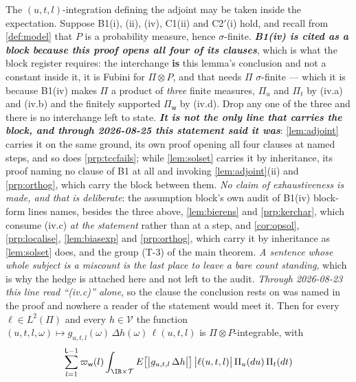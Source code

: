 \begin{lemma}\label{lem:adjfubini}
The $(u,t,l)$-integration defining the adjoint may be taken inside the expectation.
Suppose B1(i), (ii), (iv), C1(ii) and C2$'$(i) hold, and recall from \cref{def:model} that $P$ is a
probability measure, hence $\sigma$-finite. \emph{\textbf{B1(iv) is cited as a block because this proof
opens all four of its clauses}}, which is what the block register requires: the interchange \textbf{is} this lemma's
conclusion and not a constant inside it,
it is Fubini for $\Pi\otimes P$, and that needs $\Pi$ $\sigma$-finite --- which it is because B1(iv)
makes $\Pi$ a product of \emph{three} finite measures, $\Pi_u$ and $\Pi_t$ by \textup{(iv.a)} and
\textup{(iv.b)} and the finitely supported $\Pi_{\mathsf w}$ by \textup{(iv.d)}. Drop any one of the
three and there is no interchange left to state. \emph{\textbf{It is not the only line that carries the
block, and through 2026-08-25 this statement said it was}}: \cref{lem:adjoint} carries it on the same
ground, its own proof opening all four clauses at named steps, and so does \cref{prp:tccfails}; while
\cref{lem:solset} carries it by inheritance, its proof naming no clause of B1 at all and invoking
\cref{lem:adjoint}\textup{(ii)} and \cref{prp:orthog}, which carry the block between them.
\emph{No claim of exhaustiveness is made, and that is deliberate}: the assumption block's own audit of
B1(iv) block-form lines names, besides the three above, \cref{lem:bierens} and \cref{prp:kerchar}, which
consume \textup{(iv.c)} \emph{at the statement} rather than at a step, and \cref{cor:opsol},
\cref{prp:localise}, \cref{lem:biasexp} and \cref{prp:orthog}, which carry it by inheritance as
\cref{lem:solset} does, and the group \textup{(T-3)} of the main theorem. \emph{A sentence whose whole
subject is a miscount is the last place to leave a bare count standing}, which is why the hedge is
attached here and not left to the audit.
\emph{Through 2026-08-23 this line read
``\textup{(iv.c)}'' alone}, so the clause the conclusion rests on was named in the proof and nowhere a
reader of the statement would meet it. Then for every $\ell\in L^{2}(\Pi)$ and every
$h\in\mathcal V$ the function
$(u,t,l,\omega)\mapsto g_{u,t,l}(\omega)\,\Delta h(\omega)\,\ell(u,t,l)$ is $\Pi\otimes P$-integrable, with
\begin{equation}\label{eq:adjenv}
\begin{split}
\sum_{l=1}^{\mathsf L-1}\varpi_{\mathsf w}(l)&\int_{\IR\times\mathcal T}
E\big[\big|g_{u,t,l}\,\Delta h\big|\big]\,\big|\ell(u,t,l)\big|\,\Pi_u(du)\,\Pi_t(dt)\\

\end{split}
\end{equation}
\end{lemma}
